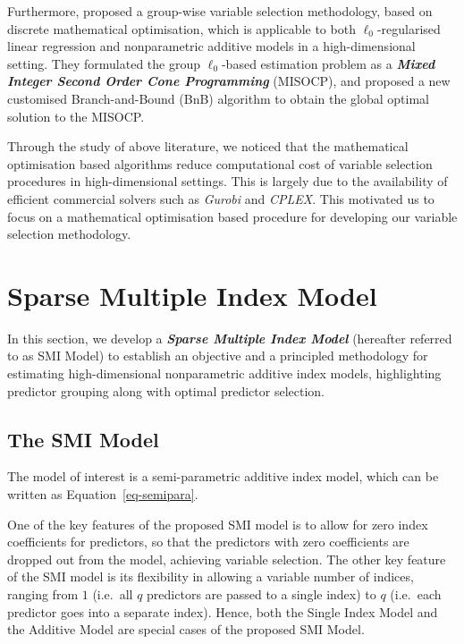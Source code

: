 \documentclass[
  11pt,
  a4paper,
]{article}
\begin{document}
Furthermore, \textcite{Hazimeh2023} proposed a group-wise variable
selection methodology, based on discrete mathematical optimisation,
which is applicable to both \(\ell_{0}\)-regularised linear regression
and nonparametric additive models in a high-dimensional setting. They
formulated the group \(\ell_{0}\)-based estimation problem as a
\textbf{\emph{Mixed Integer Second Order Cone Programming}} (MISOCP),
and proposed a new customised Branch-and-Bound (BnB) algorithm
\autocite{Land1960,Little1963} to obtain the global optimal solution to
the MISOCP.

Through the study of above literature, we noticed that the mathematical
optimisation based algorithms reduce computational cost of variable
selection procedures in high-dimensional settings. This is largely due
to the availability of efficient commercial solvers such as
\emph{Gurobi} and \emph{CPLEX}. This motivated us to focus on a
mathematical optimisation based procedure for developing our variable
selection methodology.

\section{Sparse Multiple Index Model}\label{sec-SMI}

In this section, we develop a \textbf{\emph{Sparse Multiple Index
Model}} (hereafter referred to as SMI Model) to establish an objective
and a principled methodology for estimating high-dimensional
nonparametric additive index models, highlighting predictor grouping
along with optimal predictor selection.

\subsection{The SMI Model}\label{sec-model}

The model of interest is a semi-parametric additive index model, which
can be written as Equation~\ref{eq-semipara}.

One of the key features of the proposed SMI model is to allow for zero
index coefficients for predictors, so that the predictors with zero
coefficients are dropped out from the model, achieving variable
selection. The other key feature of the SMI model is its flexibility in
allowing a variable number of indices, ranging from \(1\) (i.e.~all
\(q\) predictors are passed to a single index) to \(q\) (i.e.~each
predictor goes into a separate index). Hence, both the Single Index
Model and the Additive Model are special cases of the proposed SMI
Model.
\end{document}
